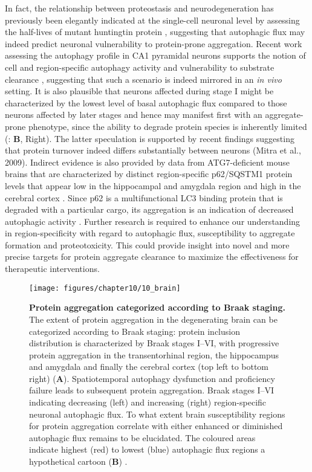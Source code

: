 In fact, the relationship between proteostasis and neurodegeneration has previously been elegantly indicated at the single-cell neuronal level by assessing the half-lives of mutant huntingtin protein \citep{Tsvetkov2013}, suggesting that autophagic flux may indeed predict neuronal vulnerability to protein-prone aggregation. Recent work assessing the autophagy profile in CA1 pyramidal neurons supports the notion of cell and region-specific autophagy activity and vulnerability to substrate clearance \citep{Bordi2016}, suggesting that such a scenario is indeed mirrored in an \textit{in vivo} setting. It is also plausible that neurons affected during stage I might be characterized by the lowest level of basal autophagic flux compared to those neurons affected by later stages and hence may manifest first with an aggregate-prone phenotype, since the ability to degrade protein species is inherently limited (: \textbf{B}, Right). The latter speculation is supported by recent findings suggesting that protein turnover indeed differs substantially between neurons (Mitra et al., 2009). Indirect evidence is also provided by data from ATG7-deficient mouse brains that are characterized by distinct region-specific p62/SQSTM1 protein levels that appear low in the hippocampal and amygdala region and high in the cerebral cortex \citep{Komatsu2007}. Since p62 is a multifunctional LC3 binding protein that is degraded with a particular cargo, its aggregation is an indication of decreased autophagic activity \citep{Komatsu2007}. Further research is required to enhance our understanding in region-specificity with regard to autophagic flux, susceptibility to aggregate formation and proteotoxicity. This could provide insight into novel and more precise targets for protein aggregate clearance to maximize the effectiveness for therapeutic interventions. 

\begin{figure}[H]
  \center
  \texttt{[image: figures/chapter10/10\_brain]}
  \caption[Protein aggregation categorized according to Braak staging]{\textbf{Protein aggregation categorized according to Braak staging.} The extent of protein aggregation in the degenerating brain can be categorized according to Braak staging: protein inclusion distribution is characterized by Braak stages I–VI, with progressive protein aggregation in the transentorhinal region, the hippocampus and amygdala and finally the cerebral cortex (top left to bottom right) (\textbf{A}). Spatiotemporal autophagy dysfunction and proficiency failure leads to subsequent protein aggregation. Braak stages I–VI indicating decreasing (left) and increasing (right) region-specific neuronal autophagic flux. To what extent brain susceptibility regions for protein aggregation correlate with either enhanced or diminished autophagic flux remains to be elucidated. The coloured areas indicate highest (red) to lowest (blue) autophagic flux regions a hypothetical cartoon (\textbf{B}) \citep{lumkwana2017}.}
  \label{fig:10_brain}
\end{figure}

